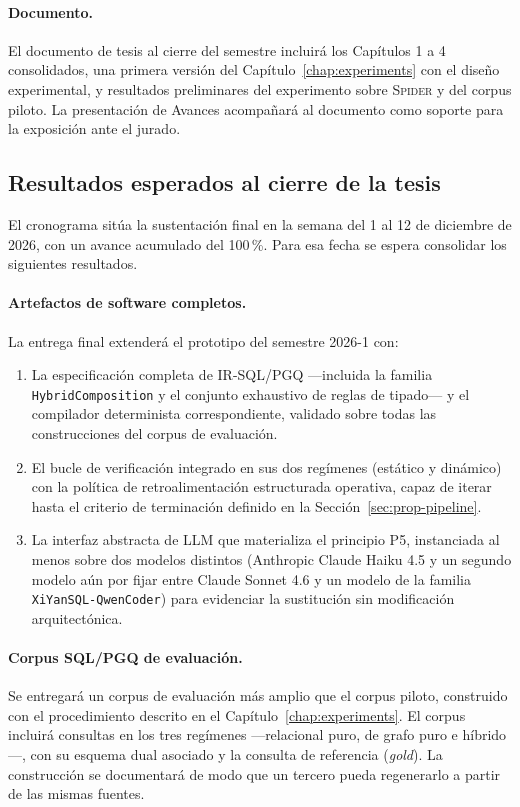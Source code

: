 \paragraph{Documento.} El documento de tesis al cierre del semestre incluirá los Capítulos 1 a 4 consolidados, una primera versión del Capítulo~\ref{chap:experiments} con el diseño experimental, y resultados preliminares del experimento sobre \textsc{Spider} y del corpus piloto. La presentación de Avances acompañará al documento como soporte para la exposición ante el jurado.

\subsection{Resultados esperados al cierre de la tesis}
\label{subsec:prop-resultados-final}

El cronograma sitúa la sustentación final en la semana del 1 al 12 de diciembre de 2026, con un avance acumulado del 100\,\%. Para esa fecha se espera consolidar los siguientes resultados.

\paragraph{Artefactos de software completos.} La entrega final extenderá el prototipo del semestre 2026-1 con:

\begin{enumerate}
    \item La especificación completa de IR-SQL/PGQ ---incluida la familia \texttt{HybridComposition} y el conjunto exhaustivo de reglas de tipado--- y el compilador determinista correspondiente, validado sobre todas las construcciones del corpus de evaluación.
    \item El bucle de verificación integrado en sus dos regímenes (estático y dinámico) con la política de retroalimentación estructurada operativa, capaz de iterar hasta el criterio de terminación definido en la Sección~\ref{sec:prop-pipeline}.
    \item La interfaz abstracta de \ac{LLM} que materializa el principio P5, instanciada al menos sobre dos modelos distintos (Anthropic Claude Haiku 4.5 y un segundo modelo aún por fijar entre Claude Sonnet 4.6 y un modelo de la familia \texttt{XiYanSQL-QwenCoder}) para evidenciar la sustitución sin modificación arquitectónica.
\end{enumerate}

\paragraph{Corpus \ac{SQL}/\ac{PGQ} de evaluación.} Se entregará un corpus de evaluación más amplio que el corpus piloto, construido con el procedimiento descrito en el Capítulo~\ref{chap:experiments}. El corpus incluirá consultas en los tres regímenes ---relacional puro, de grafo puro e híbrido---, con su esquema dual asociado y la consulta de referencia (\emph{gold}). La construcción se documentará de modo que un tercero pueda regenerarlo a partir de las mismas fuentes.

